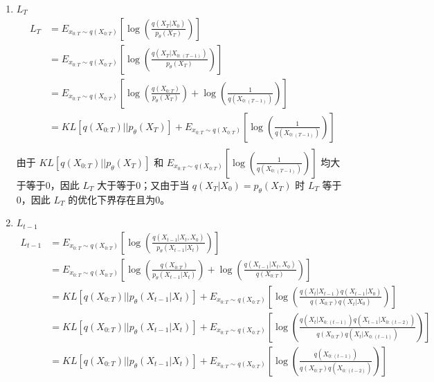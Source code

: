 \documentclass[12pt,a4paper,UTF8]{article}
\begin{document}
\begin{enumerate}
\item $L_T$
\[\begin{aligned}
L_T&=E_{x_{0:T}\sim q\left(X_{0:T}\right)}\left[\log\left(\frac{q\left(X_T|X_0\right)}{p_{\theta}\left(X_T\right)}\right)\right]\\
&=E_{x_{0:T}\sim q\left(X_{0:T}\right)}\left[\log\left(\frac{q\left(X_T|X_{0:\left(T-1\right)}\right)}{p_{\theta}\left(X_T\right)}\right)\right]\\
&=E_{x_{0:T}\sim q\left(X_{0:T}\right)}\left[\log\left(\frac{q\left(X_{0:T}\right)}{p_{\theta}\left(X_T\right)}\right)+\log\left(\frac{1}{q\left(X_{0:\left(T-1\right)}\right)}\right)\right]\\
&=KL\left[q\left(X_{0:T}\right)||p_{\theta}\left(X_T\right)\right]+E_{x_{0:T}\sim q\left(X_{0:T}\right)}\left[\log\left(\frac{1}{q\left(X_{0:\left(T-1\right)}\right)}\right)\right]\\
\end{aligned}\]
由于 $KL\left[q\left(X_{0:T}\right)||p_{\theta}\left(X_T\right)\right]$ 和 $E_{x_{0:T}\sim q\left(X_{0:T}\right)}\left[\log\left(\frac{1}{q\left(X_{0:\left(T-1\right)}\right)}\right)\right]$ 均大于等于0，因此 $L_T$ 大于等于0；又由于当 $q\left(X_T|X_0\right)=p_{\theta}\left(X_T\right)$ 时 $L_T$ 等于0，因此 $L_T$ 的优化下界存在且为0。
\item $L_{t-1}$
\[\begin{aligned}
L_{t-1}&=E_{x_{0:T}\sim q\left(X_{0:T}\right)}\left[\log\left(\frac{q\left(X_{t-1}|X_t,X_0\right)}{p_{\theta}\left(X_{t-1}|X_t\right)}\right)\right]\\
&=E_{x_{0:T}\sim q\left(X_{0:T}\right)}\left[\log\left(\frac{q\left(X_{0:T}\right)}{p_{\theta}\left(X_{t-1}|X_t\right)}\right)+\log\left(\frac{q\left(X_{t-1}|X_t,X_0\right)}{q\left(X_{0:T}\right)}\right)\right]\\
&=KL\left[q\left(X_{0:T}\right)||p_{\theta}\left(X_{t-1}|X_t\right)\right]+E_{x_{0:T}\sim q\left(X_{0:T}\right)}\left[\log\left(\frac{q\left(X_t|X_{t-1}\right)q\left(X_{t-1}|X_0\right)}{q\left(X_{0:T}\right)q\left(X_t|X_0\right)}\right)\right]\\
&=KL\left[q\left(X_{0:T}\right)||p_{\theta}\left(X_{t-1}|X_t\right)\right]+E_{x_{0:T}\sim q\left(X_{0:T}\right)}\left[\log\left(\frac{q\left(X_t|X_{0:\left(t-1\right)}\right)q\left(X_{t-1}|X_{0:\left(t-2\right)}\right)}{q\left(X_{0:T}\right)q\left(X_t|X_{0:\left(t-1\right)}\right)}\right)\right]\\
&=KL\left[q\left(X_{0:T}\right)||p_{\theta}\left(X_{t-1}|X_t\right)\right]+E_{x_{0:T}\sim q\left(X_{0:T}\right)}\left[\log\left(\frac{q\left(X_{0:\left(t-1\right)}\right)}{q\left(X_{0:T}\right)q\left(X_{0:\left(t-2\right)}\right)}\right)\right]\\

\end{aligned}\]
\end{enumerate}
\end{document}
